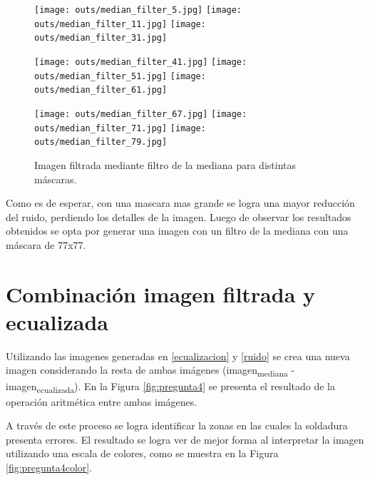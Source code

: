 \documentclass[
  letterpaper,
  twocolumn,
  9pt,
  journal,
  final]{IEEEtran}
\begin{document}
\begin{figure}[!tbh]
\centering
\texttt{[image: outs/median\_filter\_5.jpg]}\quad
\texttt{[image: outs/median\_filter\_11.jpg]}\quad
\texttt{[image: outs/median\_filter\_31.jpg]}

\medskip

\texttt{[image: outs/median\_filter\_41.jpg]}\quad
\texttt{[image: outs/median\_filter\_51.jpg]}\quad
\texttt{[image: outs/median\_filter\_61.jpg]}

\medskip

\texttt{[image: outs/median\_filter\_67.jpg]}\quad
\texttt{[image: outs/median\_filter\_71.jpg]}\quad
\texttt{[image: outs/median\_filter\_79.jpg]}


\caption{Imagen filtrada mediante filtro de la mediana para distintas máscaras.}
\label{fig:median_grid}
\end{figure}




Como es de esperar, con una mascara mas grande se logra una mayor reducción del ruido, perdiendo los detalles de la imagen. Luego de observar los resultados obtenidos se opta por generar una imagen con un filtro de la mediana con una máscara de 77x77.




\section{Combinación imagen filtrada y ecualizada}\label{p4}

Utilizando las imagenes generadas en \ref{ecualizacion} y \ref{ruido} se crea una nueva imagen considerando la resta de ambas imágenes (imagen\textsubscript{mediana} - imagen\textsubscript{ecualizada}). En la Figura \ref{fig:pregunta4} se presenta el resultado de la operación aritmética entre ambas imágenes.

A través de este proceso se logra identificar la zonas en las cuales la soldadura presenta errores. El resultado se logra ver de mejor forma al interpretar la imagen utilizando una escala de colores, como se muestra en la Figura \ref{fig:pregunta4color}.
\end{document}
